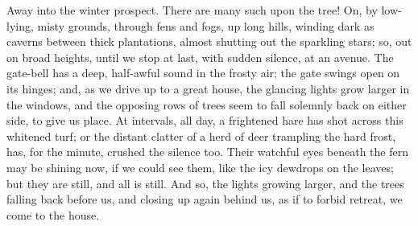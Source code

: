 Away into the winter prospect.  There are many such upon the tree!
On, by low-lying, misty grounds, through fens and fogs, up long
hills, winding dark as caverns between thick plantations, almost
shutting out the sparkling stars; so, out on broad heights, until we
stop at last, with sudden silence, at an avenue.  The gate-bell has
a deep, half-awful sound in the frosty air; the gate swings open on
its hinges; and, as we drive up to a great house, the glancing
lights grow larger in the windows, and the opposing rows of trees
seem to fall solemnly back on either side, to give us place.  At
intervals, all day, a frightened hare has shot across this whitened
turf; or the distant clatter of a herd of deer trampling the hard
frost, has, for the minute, crushed the silence too.  Their watchful
eyes beneath the fern may be shining now, if we could see them, like
the icy dewdrops on the leaves; but they are still, and all is
still.  And so, the lights growing larger, and the trees falling
back before us, and closing up again behind us, as if to forbid
retreat, we come to the house.

